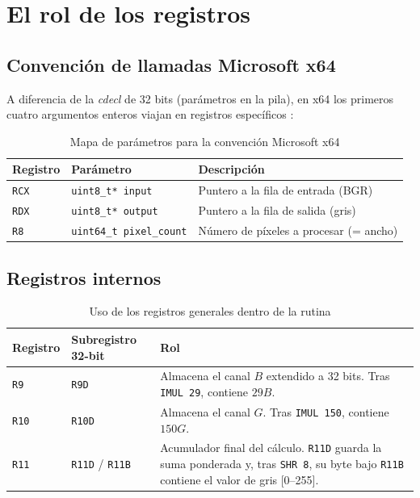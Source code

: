 \documentclass[12pt, letterpaper]{article}
\begin{document}
\section{El rol de los registros}

\subsection{Convención de llamadas Microsoft x64}

A diferencia de la \textit{cdecl} de 32 bits (parámetros en la pila), en x64 los primeros cuatro argumentos enteros viajan en registros específicos \cite{msft_x64_calling}:

\begin{table}[H]
    \centering
    \begin{tabular}{@{}lll@{}}
        \toprule
        \textbf{Registro} & \textbf{Parámetro} & \textbf{Descripción} \\
        \midrule
        \texttt{RCX} & \texttt{uint8\_t* input}        & Puntero a la fila de entrada (BGR) \\
        \texttt{RDX} & \texttt{uint8\_t* output}       & Puntero a la fila de salida (gris) \\
        \texttt{R8}  & \texttt{uint64\_t pixel\_count} & Número de píxeles a procesar (= ancho) \\
        \bottomrule
    \end{tabular}
    \caption{Mapa de parámetros para la convención Microsoft x64}
\end{table}

\subsection{Registros internos}

\begin{table}[H]
    \centering
    \begin{tabular}{@{}llp{6.5cm}@{}}
        \toprule
        \textbf{Registro} & \textbf{Subregistro 32-bit} & \textbf{Rol} \\
        \midrule
        \texttt{R9}  & \texttt{R9D}  & Almacena el canal $B$ extendido a 32 bits. Tras \texttt{IMUL 29}, contiene $29B$. \\
        \texttt{R10} & \texttt{R10D} & Almacena el canal $G$. Tras \texttt{IMUL 150}, contiene $150G$. \\
        \texttt{R11} & \texttt{R11D} / \texttt{R11B} & Acumulador final del cálculo. \texttt{R11D} guarda la suma ponderada y, tras \texttt{SHR 8}, su byte bajo \texttt{R11B} contiene el valor de gris [0--255]. \\
        \bottomrule
    \end{tabular}
    \caption{Uso de los registros generales dentro de la rutina}
\end{table}
\end{document}

